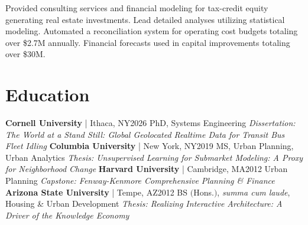 \documentclass{article}
\begin{document}
\begin{bgbox}[
        height = \paperheight,
        width = 0.69\textwidth,
        colback = white
    ]
{                Provided consulting services and financial modeling for tax-credit equity generating real estate investments. Lead detailed analyses utilizing statistical modeling. Automated a reconciliation system for operating cost budgets totaling over \$2.7M annually. Financial forecasts used in capital improvements totaling over \$30M.
            \section*{Education}
                \textbf{Cornell University} | Ithaca, NY\hfill{2026}\newline
                        PhD, Systems Engineering\newline
                            \textit{Dissertation: The World at a Stand Still: Global Geolocated Realtime Data for Transit Bus Fleet Idling}\newline\newline
                \textbf{Columbia University} | New York, NY\hfill{2019}\newline
                        MS, Urban Planning, Urban Analytics\newline
                            \textit{Thesis: Unsupervised Learning for Submarket Modeling: A Proxy for Neighborhood Change}\newline\newline
                \textbf{Harvard University} | Cambridge, MA\hfill{2012}\newline
                        Urban Planning\newline
                            \textit{Capstone: Fenway-Kenmore Comprehensive Planning \& Finance}\newline\newline
                \textbf{Arizona State University} | Tempe, AZ\hfill{2012}\newline 
                        BS $($Hons.$)$, \textit{summa cum laude}, Housing \& Urban Development\newline
                            \textit{Thesis: Realizing Interactive Architecture: A Driver of the Knowledge Economy}
}
\end{bgbox}
\end{document}
